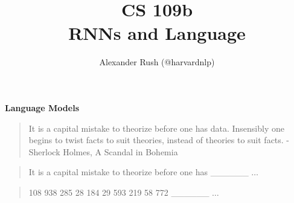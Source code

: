 \documentclass{beamer}
\title[Seq2seq]{CS 109b \\   RNNs and Language }
\author[Alexander Rush]{Alexander Rush  (@harvardnlp) \\  
}
\date{}
\newcommand{\air}{\vspace{0.25cm}}
\begin{document}
\begin{frame}
  \titlepage
\end{frame}

\begin{frame}
  \begin{center}
    \textbf{Language Models}
  \end{center}
\end{frame}

\begin{frame}
  \begin{quote}
    It is a capital mistake to theorize before one has
    data. Insensibly one begins to twist facts to suit theories,
    instead of theories to suit facts. -Sherlock Holmes, A Scandal in Bohemia
  \end{quote}


\end{frame}

\begin{frame}


  \air
   {
    \begin{quote}
    It is a capital mistake to theorize before one has \_\_\_\_\_\_ $\ldots$ 
    \end{quote}
  }
   {
    \begin{quote}
      108 938 285 28 184 29 593 219 58 772 \_\_\_\_\_\_ $\ldots$ 
    \end{quote}    
  }
\end{frame}
\end{document}
